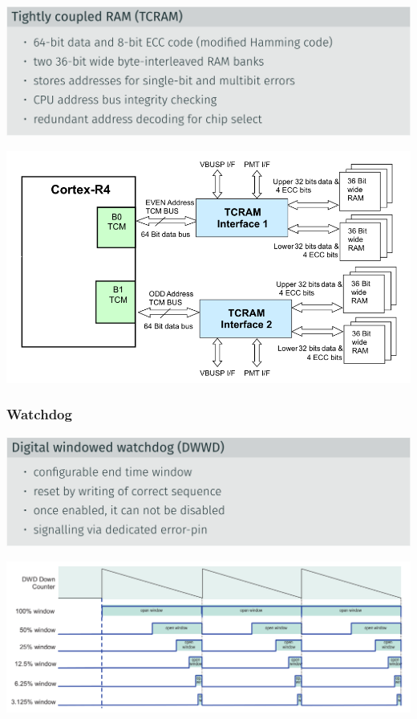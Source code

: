 \documentclass[
  10pt,
  a4paper,
  twocolumn]{article}
\begin{document}
\includegraphics{images/safety/image-25.png}

\includegraphics{images/safety/image-24.png}

\subsubsection{Watchdog}\label{watchdog}

\includegraphics{images/safety/image-27.png}

\includegraphics{images/safety/image-28.png}
\end{document}
